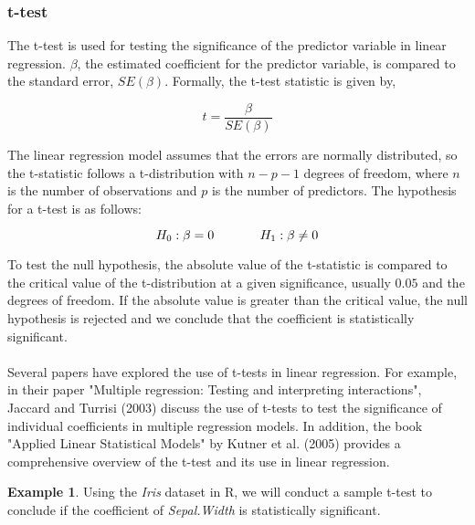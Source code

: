 \documentclass{article}[12pt]
\newcounter{example}[section]
\theoremstyle{definition}
\newtheorem{exmp}{Example}[section]
\begin{document}
 \bigskip

 \subsubsection{t-test}

 \bigskip

The t-test is used for testing the significance of the predictor variable in linear regression. $\beta$, the estimated coefficient for the predictor variable, is compared to the standard error, $SE(\beta)$. Formally, the t-test statistic is given by, 

\medskip

$$ t = \frac{\beta}{SE(\beta)}$$

\medskip

\noindent
The linear regression model assumes that the errors are normally distributed, so the t-statistic follows a t-distribution with $n - p - 1$ degrees of freedom, where $n$ is the number of observations and $p$ is the number of predictors. The hypothesis for a t-test is as follows:

\medskip

$$ H_0 : \beta = 0 \hspace{0.5in}  H_1 : \beta \neq 0 $$

\medskip


\noindent
To test the null hypothesis, the absolute value of the t-statistic is compared to the critical value of the t-distribution at a given significance, usually $0.05$ and the degrees of freedom.  If the absolute value is greater than the critical value, the null hypothesis is rejected and we conclude that the coefficient is statistically significant. 
\\
\\
Several papers have explored the use of t-tests in linear regression. For example, in their paper "Multiple regression: Testing and interpreting interactions", Jaccard and Turrisi (2003) discuss the use of t-tests to test the significance of individual coefficients in multiple regression models. In addition, the book "Applied Linear Statistical Models" by Kutner et al. (2005) provides a comprehensive overview of the t-test and its use in linear regression.

\newpage

\begin{exmp}
    Using the \emph{Iris} dataset in R, we will conduct a sample t-test to conclude if the coefficient of \emph{Sepal.Width} is statistically significant. 
\end{exmp}
\end{document}
